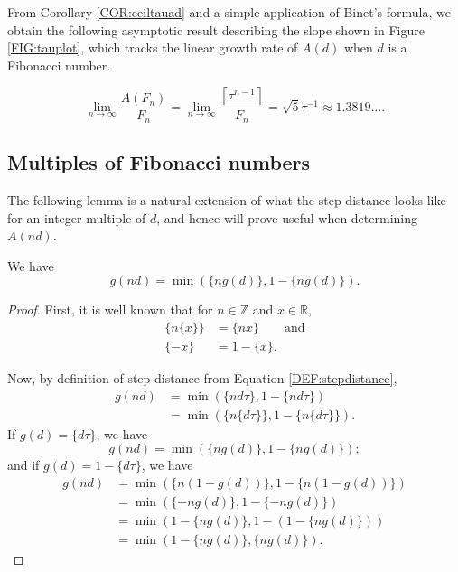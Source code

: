 \documentclass[10pt,a4paper,reqno]{amsart}
\newcommand{\Z}{{\mathbb Z}}
\newcommand{\R}{{\mathbb R}}
\begin{document}
From Corollary \ref{COR:ceiltauad} and a simple application of Binet's formula, we obtain the following asymptotic result describing the slope shown in Figure \ref{FIG:tauplot}, which tracks the linear growth rate of $A(d)$ when $d$ is a Fibonacci number.
\begin{cor}
    \[\lim_{n\to \infty}\frac{A(F_n)}{F_n} = \lim_{n\to \infty}\frac{\left\lceil\tau^{n-1}\right\rceil}{F_n} = \sqrt{5}\tau^{-1}\approx 1.3819\ldots.\]
\end{cor}

\subsection{Multiples of {F}ibonacci numbers}
The following lemma is a natural extension of what the step distance looks like for an integer multiple of $d$, and hence will prove useful when determining $A(nd)$.
\begin{lem}\label{LEM:ngofd}
We have \[g(nd)=\min(\{ ng(d)\},1-\{ ng(d)\}).\]
\end{lem}
\begin{proof}
First, it is well known that for $n\in\Z$ and $x\in\R$, 
\begin{align*}
\{ n\{ x\}\}&=\{ nx \}\qquad\text{and}\\
\{-x\}		&=1-\{x\}.
\end{align*}

Now, by definition of step distance from Equation \ref{DEF:stepdistance},
\begin{align*}
g(nd)&=\min(\{ nd\tau\}, 1-\{ nd\tau\})\\
     &=\min(\{ n\{ d\tau\}\}, 1-\{ n\{ d\tau\}\}).
\end{align*}
If $g(d)=\{ d\tau\}$, we have
\[g(nd)=\min(\{ ng(d)\}, 1-\{ ng(d)\});\]
and if $g(d)=1-\{ d\tau\}$, we have
\begin{align*}
g(nd)&=\min(\{ n(1-g(d))\}, 1-\{ n(1-g(d))\})\\
     &=\min(\{ -ng(d)\}, 1-\{ -ng(d)\})\\
     &=\min(1-\{ ng(d)\}, 1-(1-\{ ng(d)\}))\\
     &=\min(1-\{ ng(d)\}, \{ ng(d)\}).
\end{align*}
\end{proof}
\end{document}
